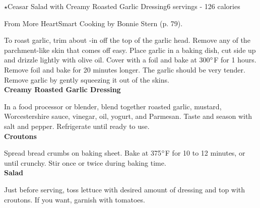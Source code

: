 \begin{recipe}{\texorpdfstring{$\star$}{str}Ceasar Salad with Creamy Roasted Garlic Dressing}{6 servings - 126 calories}{}

\freeform From {\normalfont More HeartSmart Cooking} by Bonnie Stern (p. 79).


To roast garlic, trim about -in off the top of the garlic head. Remove any of the parchment-like skin that comes off easy. Place garlic in a baking dish, cut side up and drizzle lightly with olive oil. Cover with a foil and bake at 300$\degree$F for 1 hours. Remove foil and bake for 20 minutes longer. The garlic should be very tender. Remove garlic by gently squeezing it out of the skins.\\

\textbf{Creamy Roasted Garlic Dressing}

In a food processor or blender, blend together roasted garlic, mustard, Worcestershire sauce, vinegar, oil, yogurt, and Parmesan. Taste and season with salt and pepper. Refrigerate until ready to use.\\

\textbf{Croutons}

Spread bread crumbs on baking sheet. Bake at 375$\degree$F for 10 to 12 minutes, or until crunchy. Stir once or twice during baking time.\\

\textbf{Salad}

Just before serving, toss lettuce with desired amount of dressing and top with croutons. If you want, garnish with tomatoes.

\end{recipe}